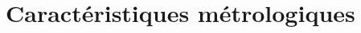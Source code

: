 

\begin{comment}

\documentclass[a4paper, 11pt, twoside, fleqn]{memoir}

\usepackage{AOCDTF}

\marqueurchapitre
\decoupagechapitre{1} %




	\openleft %

\end{comment}

\chapter{Caractéristiques métrologiques}
\ChapFrame





%

